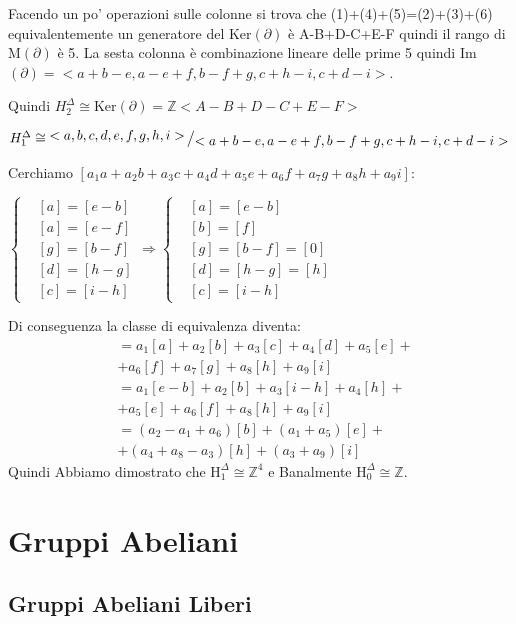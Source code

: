 \documentclass[11pt, a4paper, twoside]{article}
\newcommand{\bigslant}[2]{{\raisebox{.2em}{$#1$}\left/\raisebox{-.2em}{$#2$}\right.}}
\begin{document}
\begin{sol}
	Facendo un po' operazioni sulle colonne si trova che (1)+(4)+(5)=(2)+(3)+(6) equivalentemente un generatore del Ker$(\partial)$ è A-B+D-C+E-F quindi il rango di  $\text{M}(\partial)$ è 5. La sesta colonna è combinazione lineare delle prime 5 quindi Im$(\partial)=<a+b-e,a-e+f,b-f+g,c+h-i,c+d-i>$.

	Quindi $H_2^{\Delta}\cong \text{Ker}(\partial)=\mathbb{Z}<A-B+D-C+E-F >$

	$H_1^{\Delta}\cong \bigslant{<a,b,c,d,e,f,g,h,i>}{<a+b-e,a-e+f,b-f+g,c+h-i,c+d-i>}$ 
	
	Cerchiamo $[a_1a+a_2b+a_3c+a_4d+a_5e+a_6f+a_7g+a_8h+a_9i]$:

	$\begin{cases}
		&[a]=[e-b] \\ 
		&[a]=[e-f] \\ 
		&[g]=[b-f] \\ 
		&[d]=[h-g] \\
		&[c]=[i-h]
	\end{cases} \Rightarrow
	\begin{cases}
		&[a]=[e-b] \\
		&[b]=[f] \\
		&[g]=[b-f]=[0] \\	
		&[d]=[h-g]=[h]\\
		&[c]=[i-h]		
	\end{cases}$

	Di conseguenza la classe di equivalenza diventa:
	\begin{align}
		[a_1a+a_2b+a_3c+a_4d+a_5e+a_6f+a_7g+a_8h+a_9i]&=a_1[a]+a_2[b]+a_3[c]+a_4[d]+a_5[e]+\\
											     &+a_6[f]+a_7[g]+a_8[h]+a_9[i]\\
											     &=a_1[e-b]+a_2[b]+a_3[i-h]+a_4[h]+\\
											     &+a_5[e]+a_6[f]+a_8[h]+a_9[i] \\
											     &=(a_2-a_1+a_6)[b]+(a_1+a_5)[e]+\\
											     &+(a_4+a_8-a_3)[h]+(a_3+a_9)[i]
	\end{align}
	Quindi Abbiamo dimostrato che $\text{H}_1^\Delta\cong\mathbb{Z}^4$ e Banalmente $\text{H}_0^\Delta\cong\mathbb{Z}$. 
\end{sol}

\newpage

\section{Gruppi Abeliani}
\subsection{Gruppi Abeliani Liberi}
\end{document}

